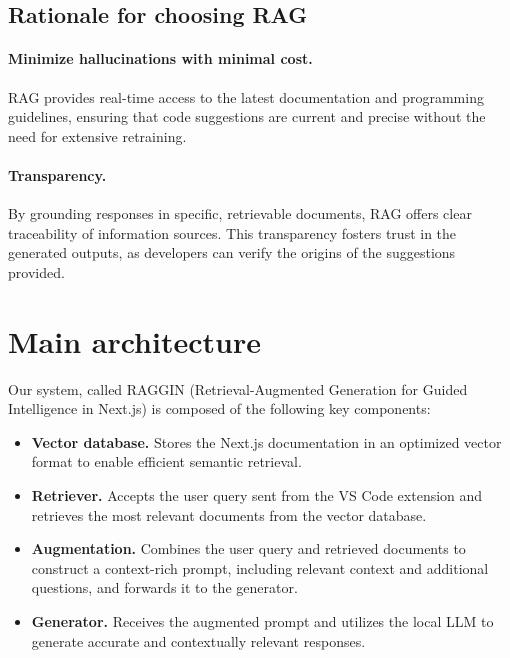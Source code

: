 

\subsection{Rationale for choosing RAG}

\paragraph*{Minimize hallucinations with minimal cost.} RAG provides real-time access to the latest documentation and programming guidelines, ensuring that code suggestions are current and precise without the need for extensive retraining.

\paragraph*{Transparency.} By grounding responses in specific, retrievable documents, RAG offers clear traceability of information sources. This transparency fosters trust in the generated outputs, as developers can verify the origins of the suggestions provided.

\section{Main architecture} \label{sec:main_archi}

Our system, called RAGGIN (Retrieval-Augmented Generation for Guided Intelligence in Next.js) is composed of the following key components:

\begin{itemize} 
	\item \textbf{Vector database.} Stores the Next.js documentation in an optimized vector format to enable efficient semantic retrieval. 
	\item \textbf{Retriever.} Accepts the user query sent from the VS Code extension and retrieves the most relevant documents from the vector database. 
	\item \textbf{Augmentation.} Combines the user query and retrieved documents to construct a context-rich prompt, including relevant context and additional questions, and forwards it to the generator. 
	\item \textbf{Generator.} Receives the augmented prompt and utilizes the local LLM to generate accurate and contextually relevant responses. 
\end{itemize}

